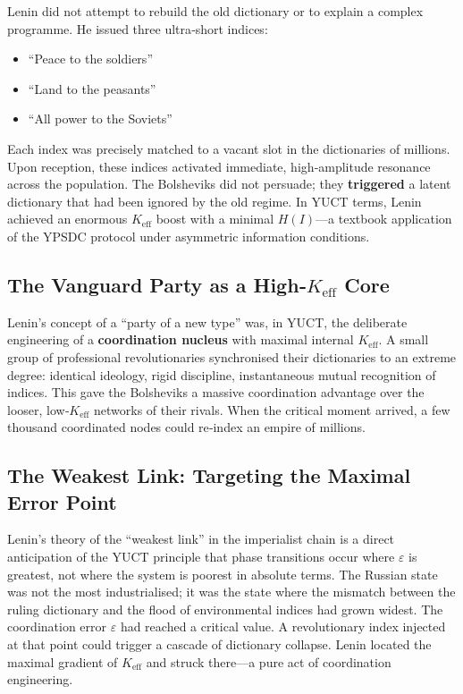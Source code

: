 \documentclass[12pt,a4paper]{article}
\newcommand{\Keff}{K_{\mathrm{eff}}}
\begin{document}
	Lenin did not attempt to rebuild the old dictionary or to explain a complex programme. He issued three ultra‑short indices:
	\begin{itemize}[leftmargin=*]
		\item “Peace to the soldiers”
		\item “Land to the peasants”
		\item “All power to the Soviets”
	\end{itemize}
	Each index was precisely matched to a vacant slot in the dictionaries of millions. Upon reception, these indices activated immediate, high‑amplitude resonance across the population. The Bolsheviks did not persuade; they \textbf{triggered} a latent dictionary that had been ignored by the old regime. In YUCT terms, Lenin achieved an enormous \(K_{\mathrm{eff}}\) boost with a minimal \(H(I)\)—a textbook application of the YPSDC protocol under asymmetric information conditions.
	
	\subsection{The Vanguard Party as a High‑\(K_{\mathrm{eff}}\) Core}
	
	Lenin’s concept of a “party of a new type” was, in YUCT, the deliberate engineering of a \textbf{coordination nucleus} with maximal internal \(K_{\mathrm{eff}}\). A small group of professional revolutionaries synchronised their dictionaries to an extreme degree: identical ideology, rigid discipline, instantaneous mutual recognition of indices. This gave the Bolsheviks a massive coordination advantage over the looser, low‑\(K_{\mathrm{eff}}\) networks of their rivals. When the critical moment arrived, a few thousand coordinated nodes could re‑index an empire of millions.
	
	\subsection{The Weakest Link: Targeting the Maximal Error Point}
	
	Lenin’s theory of the “weakest link” in the imperialist chain is a direct anticipation of the YUCT principle that phase transitions occur where \(\varepsilon\) is greatest, not where the system is poorest in absolute terms. The Russian state was not the most industrialised; it was the state where the mismatch between the ruling dictionary and the flood of environmental indices had grown widest. The coordination error \(\varepsilon\) had reached a critical value. A revolutionary index injected at that point could trigger a cascade of dictionary collapse. Lenin located the maximal gradient of \(\Keff\) and struck there—a pure act of coordination engineering.
	
\end{document}
